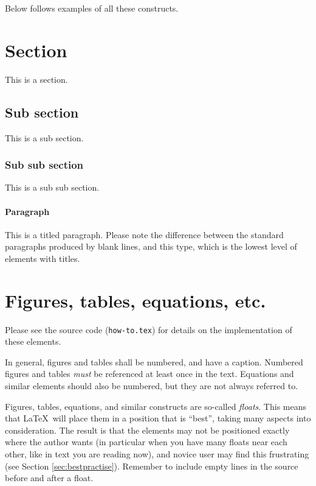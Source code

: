 Below follows examples of all these constructs.


\section{Section} 
This is a section. \lipsum[10-12]
\subsection{Sub section} 
This is a sub section. \lipsum[13-14]
\subsubsection{Sub sub section} 
This is a sub sub section. \lipsum[15-16]
\paragraph{Paragraph} 
This is a titled paragraph.
Please note the difference between the standard paragraphs produced by blank lines, and this type, which is the lowest level of elements with titles.

\lipsum[17-18]

\section{Figures, tables, equations, etc.}

Please see the source code (\texttt{how-to.tex}) for details on the implementation of these elements.

In general, figures and tables shall be numbered, and have a caption. Numbered figures and tables {\em must} be referenced at least once in the text. Equations and similar elements should also be numbered, but they are not always referred to.

Figures, tables, equations, and similar constructs are so-called {\em floats}. This means that \LaTeX\ will place them in a position that is ``best'', taking many aspects into consideration. The result is that the elements may not be positioned exactly where the author wants (in particular when you have many floats near each other, like in text you are reading now), and novice user may find this frustrating (see Section \ref{sec:bestpractise}). Remember to include empty lines in the source before and after a float.

